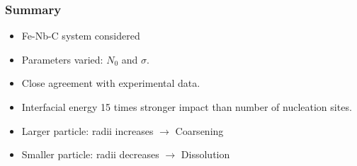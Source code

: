 \documentclass{beamer}
\begin{document}
\begin{frame}
\frametitle{Summary}
\begin{itemize}
\item Fe-Nb-C system considered 
\item Parameters varied: $N_0$ and $\sigma$.
\item Close agreement with experimental data.
\item Interfacial energy 15 times stronger impact than number of nucleation sites. 
\item Larger particle: radii increases $\rightarrow$ Coarsening
\item Smaller particle: radii decreases $\rightarrow$ Dissolution
\end{itemize}
\end{frame}
\end{document}

